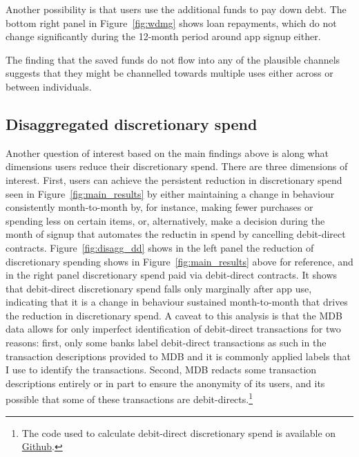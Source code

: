 Another possibility is that users use the additional funds to pay down debt.
The bottom right panel in Figure~\ref{fig:wdmg} shows loan repayments, which do
not change significantly during the 12-month period around app signup either.

The finding that the saved funds do not flow into any of the plausible channels
suggests that they might be channelled towards multiple uses either across or
between individuals.


\subsection{Disaggregated discretionary spend}%
\label{sub:disaggregated_discretionary_spend}

Another question of interest based on the main findings above is along what
dimensions users reduce their discretionary spend. There are three dimensions of
interest. First, users can achieve the persistent reduction in discretionary
spend seen in Figure~\ref{fig:main_results} by either maintaining a change in
behaviour consistently month-to-month by, for instance, making fewer purchases
or spending less on certain items, or, alternatively, make a decision during
the month of signup that automates the reductin in spend by cancelling
debit-direct contracts. Figure~\ref{fig:disagg_dd} shows in the left panel the
reduction of discretionary spending shows in Figure~\ref{fig:main_results}
above for reference, and in the right panel discretionary spend paid via
debit-direct contracts. It shows that debit-direct discretionary spend falls
only marginally after app use, indicating that it is a change in behaviour
sustained month-to-month that drives the reduction in discretionary spend. A
caveat to this analysis is that the MDB data allows for only imperfect
identification of debit-direct transactions for two reasons: first, only some
banks label debit-direct transactions as such in the transaction descriptions
provided to MDB and it is commonly applied labels that I use to identify the
transactions. Second, MDB redacts some transaction descriptions entirely or in
part to ensure the anonymity of its users, and its possible that some of these
transactions are debit-directs.\footnote{The code used to calculate
debit-direct discretionary spend is available on
\href{https://github.com/fabiangunzinger/mdb_eval/blob/f31bfcd7a330188cdd27968d41957ebf5b454099/src/data/aggregators.py\#L461}{Github}.}


